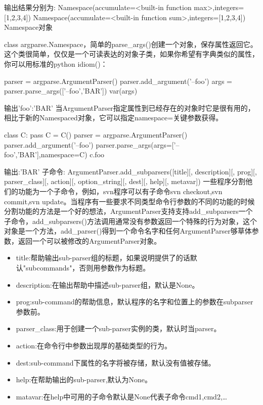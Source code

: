输出结果分别为:\newline
Namespace(accumulate=<built-in function max>,integers=[1,2,3,4])\newline
Namespace(accumulate=<built-in function sum>,integers=[1,2,3,4])\newline
Namespace对象\par
class argparse.Namespace，简单的parse\_args()创建一个对象，保存属性返回它。
这个类很简单，仅仅是一个可读表达的对象子类，如果你希望有字典类似的属性，你可以用标准的python idiom()：
\begin{python}
parser = argparse.ArgumentParser()
parser.add_argument('--foo')
args = parser.parse_args(['--foo','BAR'])
var(args)
\end{python}
输出{'foo':'BAR'}\newline
当ArgumentParser指定属性到已经存在的对象时它是很有用的，相比于新的Namespaced对象，它可以指定namespace=关键参数获得。
\begin{python}
class C:
    pass
C = C()
parser = argparse.ArgumentParser()
parser.add_argument('--foo')
parser.parse_args(args=['--foo','BAR'],namespace=C)
c.foo
\end{python}
输出:'BAR'\newline
子命令:
ArgumentParser.add\_subparsers([title][, description][, prog][, parser\_class][, action][, option\_string][, dest][, help][, metavar])
一些程序分割他们的功能为一个子命令，例如，svn程序可以有子命令svn checkout,svn commit,svn update。当程序有一些要求不同类型命令行参数的不同的功能的时候分割功能的方法是一个好的想法，ArgumentParser支持支持add\_subparsers一个子命令，add\_subparsers()方法调用通常没有参数返回一个特殊的行为对象，这个对象是一个方法，add\_parser()得到一个命令名字和任何ArgumentParser够草体参数，返回一个可以被修改的ArgumentParser对象。
\begin{itemize}
\item title:帮助输出sub-parser组的标题，如果说明提供了的话默认"subcommands"，否则用参数作为标题。
\item description:在输出帮助中描述sub-parser组，默认是None。
\item prog:sub-command的帮助信息，默认程序的名字和位置上的参数在subparser参数前。
\item parser\_class:用于创建一个sub-parser实例的类，默认时当parser。
\item action:在命令行中参数出现厚的基础类型的行为。
\item dest:sub-command下属性的名字将被存储，默认没有值被存储。
\item help:在帮助输出的sub-parser,默认为None。
\item matavar:在help中可用的子命令默认是None代表子命令{cmd1,cmd2,\dots}
\end{itemize}
